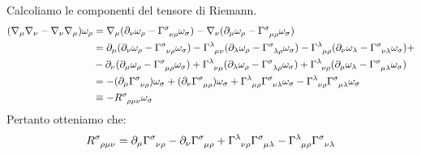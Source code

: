 Calcoliamo le componenti del tensore di Riemann.
\begin{align*}
    (\nabla_\mu \nabla_\nu - \nabla_\nu \nabla_\mu)\omega_\rho &= \nabla_\mu(\partial_\nu\omega_\rho - \tensor{\Gamma}{^\sigma_{\nu\rho}}\omega_\sigma) - \nabla_\nu(\partial_\mu \omega_\rho - \tensor{\Gamma}{^\sigma_{\mu\rho}}\omega_\sigma) \\
    &= \partial_\mu(\partial_\nu\omega_\rho - \tensor{\Gamma}{^\sigma_{\nu\rho}}\omega_\sigma) - \tensor{\Gamma}{^\lambda_{\mu\nu}}(\partial_\lambda\omega_\rho - \tensor{\Gamma}{^\sigma_{\lambda\rho}}\omega_\sigma )
    - \tensor{\Gamma}{^\lambda_{\mu\rho}}(\partial_\nu\omega_\lambda - \tensor{\Gamma}{^\sigma_{\nu\lambda}}\omega_\sigma) +\\
    &- \partial_\nu(\partial_\mu \omega_\rho - \tensor{\Gamma}{^\sigma_{\mu\rho}}\omega_\sigma) + \tensor{\Gamma}{^\lambda_{\nu\mu}}(\partial_\lambda\omega_\rho - \tensor{\Gamma}{^\sigma_{\lambda\rho}}\omega_\sigma) + \tensor{\Gamma}{^\lambda_{\nu\rho}}(\partial_\mu\omega_\lambda - \tensor{\Gamma}{^\sigma_{\mu\lambda}}\omega_\sigma) \\
    &= -(\partial_\mu\tensor{\Gamma}{^\sigma_{\nu\rho}})\omega_\sigma + (\partial_\nu\tensor{\Gamma}{^\sigma_{\mu\rho}})\omega_\sigma + \tensor{\Gamma}{^\lambda_{\mu\rho}} \tensor{\Gamma}{^\sigma_{\nu\lambda}}\omega_\sigma -\tensor{\Gamma}{^\lambda_{\nu\rho}} \tensor{\Gamma}{^\sigma_{\mu\lambda}}\omega_\sigma \\
    & \equiv - \tensor{R}{^\sigma_{\rho\mu\nu}}\omega_\sigma
\end{align*}
Pertanto otteniamo che:
\begin{equation}
\tensor{R}{^\sigma_{\rho\mu\nu}} = \partial_\mu\tensor{\Gamma}{^\sigma_{\nu\rho}}- \partial_\nu\tensor{\Gamma}{^\sigma_{\mu\rho}} +\tensor{\Gamma}{^\lambda_{\nu\rho}} \tensor{\Gamma}{^\sigma_{\mu\lambda}} - \tensor{\Gamma}{^\lambda_{\mu\rho}} \tensor{\Gamma}{^\sigma_{\nu\lambda}}
\label{eq.riemcompon}
\end{equation}


